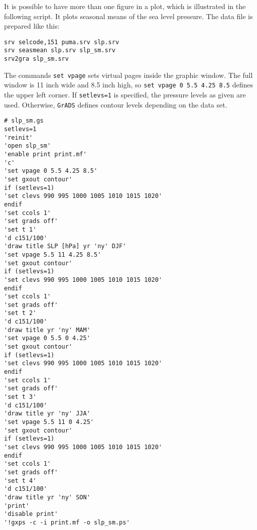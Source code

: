 \vspace{3mm}
It is possible to have more than one figure in a plot, which is illustrated in the following script. It plots seasonal means of the sea level pressure. The data file is prepared like this:

\begin{verbatim}
srv selcode,151 puma.srv slp.srv
srv seasmean slp.srv slp_sm.srv
srv2gra slp_sm.srv
\end{verbatim}

The commands \verb/set vpage/ sets virtual pages inside the graphic window. The full window is 11 inch wide and 8.5 inch high, so \verb/set vpage 0 5.5 4.25 8.5/ defines the upper left corner. If \verb/setlevs=1/ is specified, the pressure levels as given are used. Otherwise, \verb/GrADS/ defines contour levels depending on the data set.

\begin{verbatim}
# slp_sm.gs
setlevs=1
'reinit'
'open slp_sm'
'enable print print.mf'
'c'
'set vpage 0 5.5 4.25 8.5'
'set gxout contour'
if (setlevs=1)
'set clevs 990 995 1000 1005 1010 1015 1020'
endif
'set ccols 1'
'set grads off'
'set t 1'
'd c151/100'
'draw title SLP [hPa] yr 'ny' DJF'
'set vpage 5.5 11 4.25 8.5'
'set gxout contour'
if (setlevs=1)
'set clevs 990 995 1000 1005 1010 1015 1020'
endif
'set ccols 1'
'set grads off'
'set t 2'
'd c151/100'
'draw title yr 'ny' MAM'
'set vpage 0 5.5 0 4.25'
'set gxout contour'
if (setlevs=1)
'set clevs 990 995 1000 1005 1010 1015 1020'
endif
'set ccols 1'
'set grads off'
'set t 3'
'd c151/100'
'draw title yr 'ny' JJA'
'set vpage 5.5 11 0 4.25'
'set gxout contour'
if (setlevs=1)
'set clevs 990 995 1000 1005 1010 1015 1020'
endif
'set ccols 1'
'set grads off'
'set t 4'
'd c151/100'
'draw title yr 'ny' SON'
'print'
'disable print'
'!gxps -c -i print.mf -o slp_sm.ps'
\end{verbatim}
